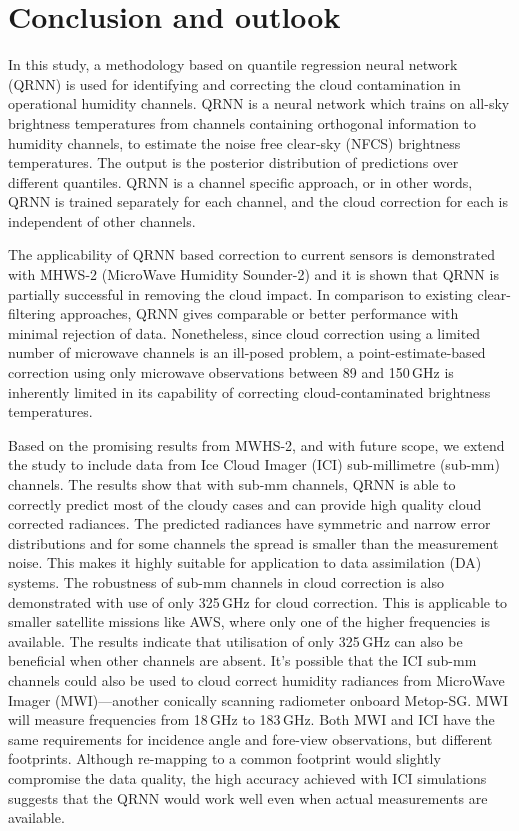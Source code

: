 \documentclass[amt, manuscript]{copernicus}
\begin{document}
\section{Conclusion and outlook}  %
\label{conclusions}
%

In this study, a methodology based on quantile regression neural network (QRNN) is used for identifying and correcting the cloud contamination in operational humidity channels. QRNN is a neural network which trains on all-sky brightness temperatures from  channels containing orthogonal information to humidity channels, to estimate the noise free clear-sky (NFCS) brightness temperatures. The output is the posterior distribution of predictions over different quantiles. QRNN is a channel specific approach, or in other words, QRNN is trained separately for each channel, and the cloud correction for each is independent of other channels. 

The applicability of QRNN based correction to current sensors is demonstrated
with MHWS-2 (MicroWave Humidity Sounder-2) and it is shown that QRNN is
partially successful in removing the cloud impact. In comparison to existing
clear-filtering approaches, QRNN gives comparable or better performance with
minimal rejection of data. Nonetheless, since cloud correction using a limited
number of microwave channels is an ill-posed problem, a point-estimate-based
correction using only microwave observations between 89 and 150\,GHz is
inherently limited in its capability of correcting cloud-contaminated brightness
temperatures.


Based on the promising results from MWHS-2, and with future scope, we extend the study to include data from Ice Cloud Imager (ICI) sub-millimetre (sub-mm) channels. The results show that with  sub-mm channels, QRNN is able to correctly predict most of the cloudy cases and can provide high quality cloud corrected radiances. The predicted radiances have symmetric and narrow error distributions and for some channels the spread is smaller than the measurement noise. This makes it highly suitable for application to data assimilation (DA) systems. The robustness of sub-mm channels in cloud correction is also demonstrated with use of only 325\,GHz for cloud correction. This is applicable to smaller satellite missions like AWS, where only one of the higher frequencies is available. The results indicate that utilisation of only 325\,GHz can also be beneficial when other channels are absent. It's possible that the ICI sub-mm channels could also be used to cloud correct humidity radiances from MicroWave Imager (MWI)---another conically scanning radiometer onboard Metop-SG. MWI will measure frequencies from 18\,GHz to 183\,GHz. Both MWI and ICI have the same requirements for incidence angle and fore-view observations, but different footprints. Although re-mapping to a common footprint  would slightly compromise the data quality, the high accuracy achieved with ICI simulations suggests that the QRNN would work well even when actual measurements are available.
\end{document}
